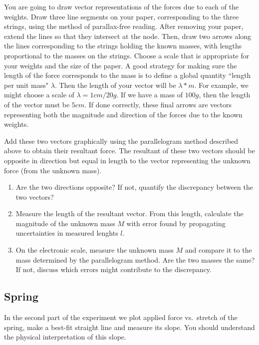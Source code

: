 You are going to draw vector representations of the forces due to each of the weights. Draw three line segments on your paper, corresponding to the three strings, using the method of parallax-free reading. After removing your paper, extend the lines so that they intersect at the node. Then, draw two arrows along the lines corresponding to the strings holding the known masses, with lengths proportional to the masses on the strings. Choose a scale that is appropriate for your weights and the size of the paper. A good strategy for making sure the length of the force corresponds to the mass is to define a global quantity ``length per unit mass" $\lambda$. Then the length of your vector will be $\lambda * m$.  For example, we might choose a scale of $\lambda = 1cm/20g$. If we have a mass of $100g$, then the length of the vector must be $5cm$. If done correctly, these final arrows are vectors representing both the magnitude and direction of the forces due to the known weights.\myskip

Add these two vectors graphically using the parallelogram method described above to obtain their resultant force. The resultant of these two vectors should be opposite in direction but equal in length to the vector representing the unknown force (from the unknown mass). 

\begin{enumerate}
    \item Are the two directions opposite? If not,  quantify the discrepancy between the two vectors?
    \item Measure the length of the resultant vector. From this length, calculate the magnitude of the unknown mass $M$ with error found by propagating uncertainties in measured lenghts $l$.
    
\item On the electronic scale, measure the unknown mass $M$ and compare it to the mass determined by the parallelogram method. Are the two masses the  same?  If not, discuss which errors might contribute to the discrepancy.
\end{enumerate}

\subsection{Spring}

In the second part of the experiment we plot applied force vs.\ stretch of the spring, make a best-fit straight line and measure its slope. You should understand the physical interpretation of this slope. \myskip

